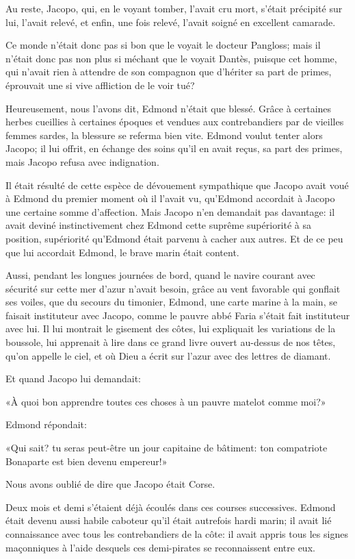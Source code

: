 Au reste, Jacopo, qui, en le voyant tomber, l'avait cru mort, s'était précipité sur lui, l'avait relevé, et enfin, une fois relevé, l'avait soigné en excellent camarade.

Ce monde n'était donc pas si bon que le voyait le docteur Pangloss; mais il n'était donc pas non plus si méchant que le voyait Dantès, puisque cet homme, qui n'avait rien à attendre de son compagnon que d'hériter sa part de primes, éprouvait une si vive affliction de le voir tué?

Heureusement, nous l'avons dit, Edmond n'était que blessé. Grâce à certaines herbes cueillies à certaines époques et vendues aux contrebandiers par de vieilles femmes sardes, la blessure se referma bien vite. Edmond voulut tenter alors Jacopo; il lui offrit, en échange des soins qu'il en avait reçus, sa part des primes, mais Jacopo refusa avec indignation.

Il était résulté de cette espèce de dévouement sympathique que Jacopo avait voué à Edmond du premier moment où il l'avait vu, qu'Edmond accordait à Jacopo une certaine somme d'affection. Mais Jacopo n'en demandait pas davantage: il avait deviné instinctivement chez Edmond cette suprême supériorité à sa position, supériorité qu'Edmond était parvenu à cacher aux autres. Et de ce peu que lui accordait Edmond, le brave marin était content.

Aussi, pendant les longues journées de bord, quand le navire courant avec sécurité sur cette mer d'azur n'avait besoin, grâce au vent favorable qui gonflait ses voiles, que du secours du timonier, Edmond, une carte marine à la main, se faisait instituteur avec Jacopo, comme le pauvre abbé Faria s'était fait instituteur avec lui. Il lui montrait le gisement des côtes, lui expliquait les variations de la boussole, lui apprenait à lire dans ce grand livre ouvert au-dessus de nos têtes, qu'on appelle le ciel, et où Dieu a écrit sur l'azur avec des lettres de diamant.

Et quand Jacopo lui demandait:

«À quoi bon apprendre toutes ces choses à un pauvre matelot comme moi?»

Edmond répondait:

«Qui sait? tu seras peut-être un jour capitaine de bâtiment: ton compatriote Bonaparte est bien devenu empereur!»

Nous avons oublié de dire que Jacopo était Corse.

Deux mois et demi s'étaient déjà écoulés dans ces courses successives. Edmond était devenu aussi habile caboteur qu'il était autrefois hardi marin; il avait lié connaissance avec tous les contrebandiers de la côte: il avait appris tous les signes maçonniques à l'aide desquels ces demi-pirates se reconnaissent entre eux.

